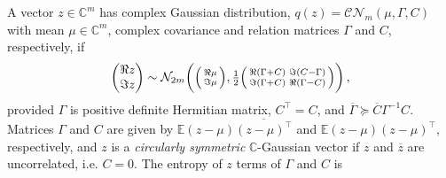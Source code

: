 \documentclass[a4paper,10pt,twocolumn]{article}
\newcommand{\cplx}{\mathbb{C}}
\newcommand{\conj}[1]{\overline{#1}}
\begin{document}
A vector $z\in \cplx^m$ has complex Gaussian distribution, $
  q(z) = \mathcal{C}\mathcal{N}_m(\mu, \Gamma, C)
$ with mean $\mu \in \cplx^m$, complex covariance and relation matrices $\Gamma$ and $C$,
respectively, if
\begin{equation}  \label{eq:cn-paired-real-density}
  \begin{pmatrix}
    \Re z \\ \Im z
  \end{pmatrix}
    \sim \mathcal{N}_{2 m}\biggl(
      \Bigl(
        \begin{smallmatrix}
          \Re \mu \\ \Im \mu
        \end{smallmatrix}
      \Bigr),
      \tfrac12 \Bigl(
        \begin{smallmatrix}
          \Re{(\Gamma + C)} & \Im{(C - \Gamma)} \\
          \Im{(\Gamma + C)} & \Re{(\Gamma - C)}
        \end{smallmatrix}
      \Bigr)
    \biggr)
    \,,
\end{equation}
provided $\Gamma$ is positive definite Hermitian matrix, $C^\top = C$, and $
  \conj{\Gamma} \succeq \conj{C} \Gamma^{-1} C
$.
%
Matrices $\Gamma$ and $C$ are given by $
  \mathbb{E} (z - \mu)\conj{(z - \mu)^\top}
$ and $
  \mathbb{E} (z - \mu)(z - \mu)^{\top}
$, respectively, and $z$ is a \emph{circularly symmetric} $\cplx$-Gaussian vector
if $z$ and $\conj{z}$ are uncorrelated, i.e. $C = 0$.
%
The entropy of $z$ terms of $\Gamma$ and $C$ is
\end{document}

